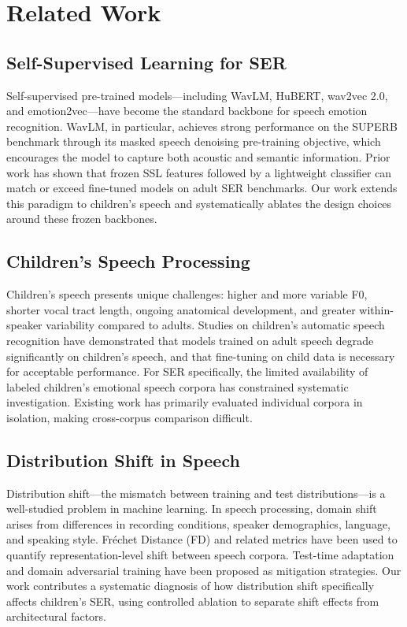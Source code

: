 \section{Related Work}

\subsection{Self-Supervised Learning for SER}

Self-supervised pre-trained models---including WavLM, HuBERT, wav2vec 2.0, and emotion2vec---have become the standard backbone for speech emotion recognition. WavLM, in particular, achieves strong performance on the SUPERB benchmark through its masked speech denoising pre-training objective, which encourages the model to capture both acoustic and semantic information. Prior work has shown that frozen SSL features followed by a lightweight classifier can match or exceed fine-tuned models on adult SER benchmarks. Our work extends this paradigm to children's speech and systematically ablates the design choices around these frozen backbones.

\subsection{Children's Speech Processing}

Children's speech presents unique challenges: higher and more variable F0, shorter vocal tract length, ongoing anatomical development, and greater within-speaker variability compared to adults. Studies on children's automatic speech recognition have demonstrated that models trained on adult speech degrade significantly on children's speech, and that fine-tuning on child data is necessary for acceptable performance. For SER specifically, the limited availability of labeled children's emotional speech corpora has constrained systematic investigation. Existing work has primarily evaluated individual corpora in isolation, making cross-corpus comparison difficult.

\subsection{Distribution Shift in Speech}

Distribution shift---the mismatch between training and test distributions---is a well-studied problem in machine learning. In speech processing, domain shift arises from differences in recording conditions, speaker demographics, language, and speaking style. Fr\'{e}chet Distance (FD) and related metrics have been used to quantify representation-level shift between speech corpora. Test-time adaptation and domain adversarial training have been proposed as mitigation strategies. Our work contributes a systematic diagnosis of how distribution shift specifically affects children's SER, using controlled ablation to separate shift effects from architectural factors.

